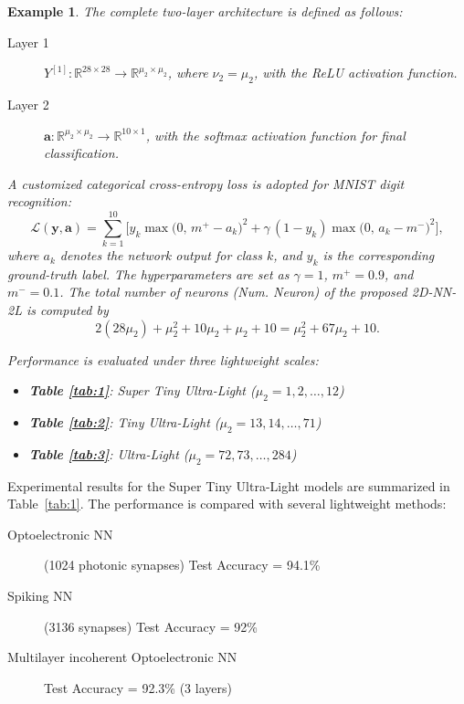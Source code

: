 \documentclass[pdflatex,sn-mathphys-num]{sn-jnl}%
\theoremstyle{thmstyleone}%
\theoremstyle{thmstyletwo}%
\newtheorem{example}{Example}%
\theoremstyle{thmstylethree}%
\begin{document}
\begin{example}
The complete two-layer architecture is defined as follows:
\begin{description}
\item[Layer 1] $Y^{[1]}: \mathbb{R}^{28\times 28} \to \mathbb{R}^{\mu_2\times \mu_2}$, where $\nu_2 = \mu_2$, with the ReLU activation function.
\item[Layer 2] $\boldsymbol{a}: \mathbb{R}^{\mu_2\times \mu_2} \to \mathbb{R}^{10\times 1}$, with the softmax activation function for final classification.
\end{description}

A customized categorical cross-entropy loss is adopted for MNIST digit recognition:
\begin{equation}\label{CusCatLoss}
\mathcal{L}(\boldsymbol{y}, \boldsymbol{a})
=
\sum_{k=1}^{10}
\biggl[
y_k \max\bigl(0,\, m^{+} - a_k\bigr)^2
+ \gamma\,(1-y_k) \max\bigl(0,\, a_k - m^{-}\bigr)^2
\biggr],
\end{equation}
where $a_k$ denotes the network output for class $k$, and $y_k$ is the corresponding ground-truth label.
The hyperparameters are set as $\gamma=1$, $m^{+}=0.9$, and $m^{-}=0.1$.
The total number of neurons (Num. Neuron) of the proposed 2D-NN-2L is computed by
\[
2(28\mu_2)+\mu_2^2+10\mu_2+\mu_2+10
= \mu_2^2 + 67\mu_2 + 10.
\]

Performance is evaluated under three lightweight scales:
\begin{itemize}
    \item \textbf{Table \ref{tab:1}}: Super Tiny Ultra-Light ($\mu_2 = 1,2,\dots,12$)
    \item \textbf{Table \ref{tab:2}}: Tiny Ultra-Light ($\mu_2 = 13,14,\dots,71$)
    \item \textbf{Table \ref{tab:3}}: Ultra-Light ($\mu_2 = 72,73,\dots,284$)
\end{itemize}
\end{example}

Experimental results for the Super Tiny Ultra-Light models are summarized in Table~\ref{tab:1}.
The performance is compared with several lightweight methods:
\begin{description}
\item[Optoelectronic NN \cite{Zhu2022}] (1024 photonic synapses) Test Accuracy = 94.1\%
\item[Spiking NN \cite{Beyeler2013}] (3136 synapses) Test Accuracy = 92\%
\item[Multilayer incoherent Optoelectronic NN \cite{Song2024}] Test Accuracy = 92.3\% (3 layers)
\end{description}
\end{document}

